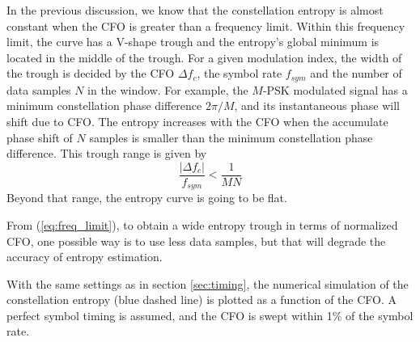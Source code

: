 \documentclass[journal,comsoc]{IEEEtran}
\begin{document}
In the previous discussion, we know that the constellation entropy is almost constant when the CFO is greater than a frequency limit.
Within this frequency limit, the curve has a V-shape trough and the entropy's global minimum is located in the middle of the trough.
For a given modulation index, the width of the trough is decided by the CFO \(\Delta f_c\), the symbol rate $f_{sym}$ and the number of data samples $N$ in the window.
For example, the \(M\)-PSK modulated signal has a minimum constellation phase difference \(2\pi/M\), and its instantaneous phase will shift due to CFO.
The entropy increases with the CFO when the accumulate phase shift of \(N\) samples is smaller than the minimum constellation phase difference. 
This trough range is given by
\begin{equation}
\frac{{\left| {\Delta {f_c}} \right|}}{{{f_{sym}}}} < \frac{1}{{MN}}
\label{eq:freq_limit}
\end{equation}
Beyond that range, the entropy curve is going to be flat.

From (\ref{eq:freq_limit}), to obtain a wide entropy trough in terms of normalized CFO, one possible way is to use less data samples, but that will degrade the accuracy of entropy estimation.



With the same settings as in section \ref{sec:timing}, the numerical simulation of the constellation entropy (blue dashed line) is plotted as a function of the CFO.
A perfect symbol timing is assumed, and the CFO is swept within 1\% of the symbol rate.


\end{document}
